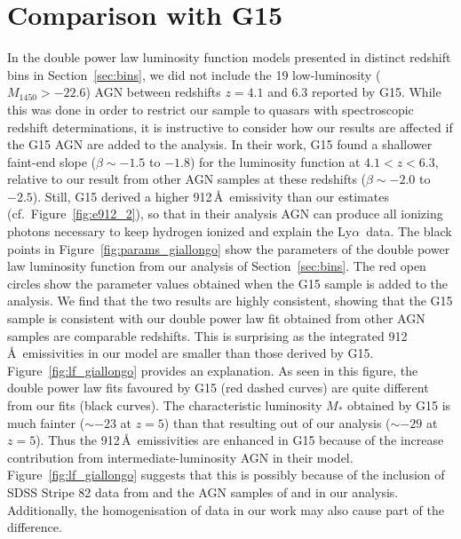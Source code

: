 \documentclass[fleqn,usenatbib]{mnras}
\def\lya{Ly$\alpha$~}
\begin{document}
\section{Comparison with G15}
\label{sec:conv}
In the double power law luminosity function models presented in
distinct redshift bins in Section~\ref{sec:bins}, we did not include
the 19 low-luminosity ($M_{1450}>-22.6$) AGN between redshifts $z=4.1$
and $6.3$ reported by G15.  While this was done in order to restrict
our sample to quasars with spectroscopic redshift determinations, it
is instructive to consider how our results are affected if the G15 AGN
are added to the analysis.  In their work, G15 found a shallower
faint-end slope ($\beta\sim -1.5$ to $-1.8$) for the luminosity
function at $4.1 < z < 6.3$, relative to our result from other AGN
samples at these redshifts ($\beta\sim -2.0$ to $-2.5$).  Still, G15
derived a higher 912\,\AA\ emissivity than our estimates
(cf.\ Figure~\ref{fig:e912_2}), so that in their analysis AGN can
produce all ionizing photons necessary to keep hydrogen ionized and
explain the \lya data.  The black points in
Figure~\ref{fig:params_giallongo} show the parameters of the double
power law luminosity function from our analysis of
Section~\ref{sec:bins}.  The red open circles show the parameter
values obtained when the G15 sample is added to the analysis.  We find
that the two results are highly consistent, showing that the G15
sample is consistent with our double power law fit obtained from other
AGN samples are comparable redshifts.  This is surprising as the
integrated 912\,\AA\ emissivities in our model are smaller than those
derived by G15.  Figure~\ref{fig:lf_giallongo} provides an
explanation.  As seen in this figure, the double power law fits
favoured by G15 (red dashed curves) are quite different from our fits
(black curves).  The characteristic luminosity $M_*$ obtained by G15
is much fainter ($\sim -23$ at $z = 5$) than that resulting out of our
analysis ($\sim -29$ at $z = 5$).  Thus the 912\,\AA\ emissivities are
enhanced in G15 because of the increase contribution from
intermediate-luminosity AGN in their model.
Figure~\ref{fig:lf_giallongo} suggests that this is possibly because
of the inclusion of SDSS Stripe 82 data from
\citet{2013ApJ...768..105M} and the AGN samples of
\citet{2010AJ....139..906W} and \citet{2015ApJ...798...28K} in our
analysis.  Additionally, the homogenisation of data in our work may
also cause part of the difference.
\end{document}
